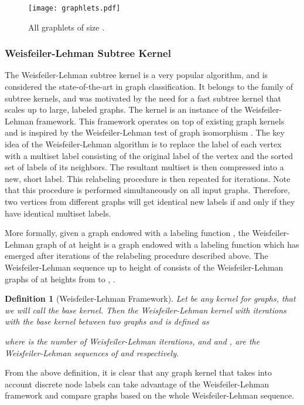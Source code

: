 \documentclass[twoside,11pt]{article}
\newtheorem{definition}{Definition}
\begin{document}
\begin{figure}[t]
    \centering
    \texttt{[image: graphlets.pdf]}
    \caption{All graphlets of size .}
    \label{fig:graphlets}
\end{figure}

\subsubsection{Weisfeiler-Lehman Subtree Kernel}
The Weisfeiler-Lehman subtree kernel is a very popular algorithm, and is considered the state-of-the-art in graph classification.
It belongs to the family of subtree kernels, and was motivated by the need for a fast subtree kernel that scales up to large, labeled graphs.
The kernel is an instance of the Weisfeiler-Lehman framework.
This framework operates on top of existing graph kernels and is inspired by the Weisfeiler-Lehman test of graph isomorphism \cite{weisfeiler1968reduction}.
The key idea of the Weisfeiler-Lehman algorithm is to replace the label of each vertex with a multiset label consisting of the original label of the vertex and the sorted set of labels of its neighbors.
The resultant multiset is then compressed into a new, short label.
This relabeling procedure is then repeated for  iterations.
Note that this procedure is performed simultaneously on all input graphs.
Therefore, two vertices from different graphs will get identical new labels if and only if they have identical multiset labels.

More formally, given a graph  endowed with a labeling function , the Weisfeiler-Lehman graph of  at height  is a graph  endowed with a labeling function  which has emerged after  iterations of the relabeling procedure described above.
The Weisfeiler-Lehman sequence up to height  of  consists of the Weisfeiler-Lehman graphs of  at heights from  to , . 
\begin{definition}[Weisfeiler-Lehman Framework]
  Let  be any kernel for graphs, that we will call the base kernel.
  Then the Weisfeiler-Lehman kernel with  iterations with the base kernel  between two graphs  and  is defined as
  
  where  is the number of Weisfeiler-Lehman iterations, and  and ,  are the Weisfeiler-Lehman sequences of  and  respectively.
\end{definition}
From the above definition, it is clear that any graph kernel that takes into account discrete node labels can take advantage of the Weisfeiler-Lehman framework and compare graphs based on the whole Weisfeiler-Lehman sequence.
\end{document}
